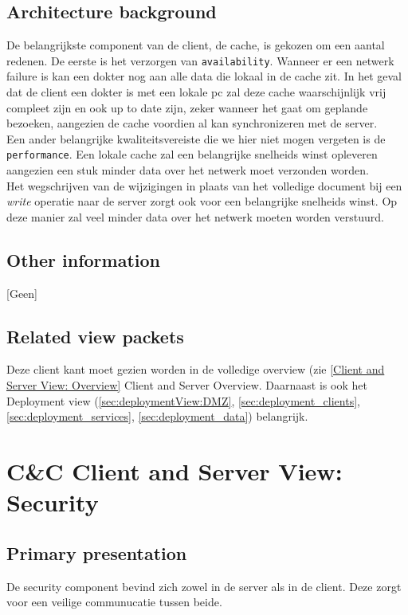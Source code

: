 \documentclass[a4paper,10pt]{article}
\begin{document}
\subsection{Architecture background}
De belangrijkste component van de client, de cache, is gekozen om een aantal redenen.  De eerste is het verzorgen van \texttt{availability}.  Wanneer er een netwerk failure is kan een dokter nog aan alle data die lokaal in de cache zit.  In het geval dat de client een dokter is met een lokale pc zal deze cache waarschijnlijk vrij compleet zijn en ook up to date zijn, zeker wanneer het gaat om geplande bezoeken, aangezien de cache voordien al kan synchronizeren met de server.\\
Een ander belangrijke kwaliteitsvereiste die we hier niet mogen vergeten is de \texttt{performance}.  Een lokale cache zal een belangrijke snelheids winst opleveren aangezien een stuk minder data over het netwerk moet verzonden worden.\\
Het wegschrijven van de wijzigingen in plaats van het volledige document bij een \textit{write} operatie naar de server zorgt ook voor een belangrijke snelheids winst.  Op deze manier zal veel minder data over het netwerk moeten worden verstuurd.

\subsection{Other information}
[Geen]

\subsection{Related view packets}
Deze client kant moet gezien worden in de volledige overview (zie \ref{Client and Server View: Overview} Client and Server Overview.  Daarnaast is ook het Deployment view (\ref{sec:deploymentView:DMZ}, \ref{sec:deployment_clients}, \ref{sec:deployment_services}, \ref{sec:deployment_data}) belangrijk.


\clearpage
\section{C\&C Client and Server View: Security}
\label{Client and Server View: Security}

\subsection{Primary presentation}
De security component bevind zich zowel in de server als in de client. Deze zorgt voor een veilige communucatie tussen beide.
\end{document}
